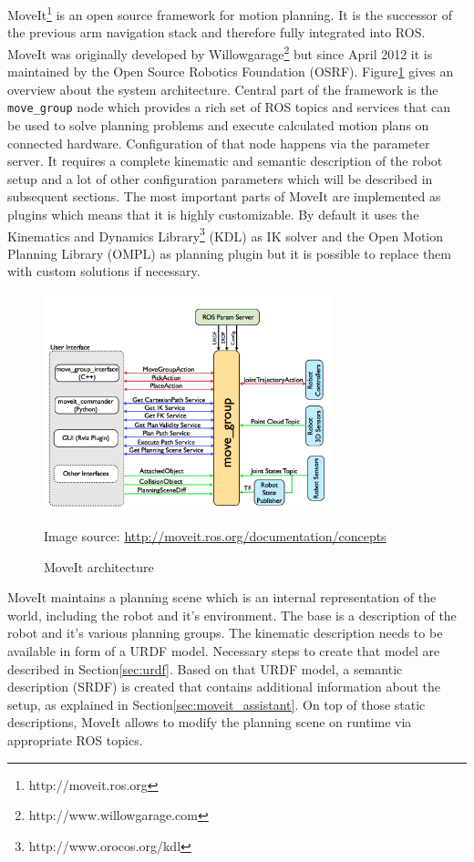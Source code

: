 MoveIt\footnote{http://moveit.ros.org} is an open source framework for motion planning. It is the successor of the previous arm navigation stack and therefore fully integrated into ROS. MoveIt was originally developed by Willowgarage\footnote{http://www.willowgarage.com} but since April 2012 it is maintained by the Open Source Robotics Foundation (OSRF). Figure\ref{fig:moveit_arch} gives an overview about the system architecture. Central part of the framework is the \texttt{move\_group} node which  provides a rich set of ROS topics and services that can be used to solve planning problems and execute calculated motion plans on connected hardware. Configuration of that node happens via the parameter server. It requires a complete kinematic and semantic description of the robot setup and a lot of other configuration parameters which will be described in subsequent sections. The most important parts of MoveIt are implemented as plugins which means that it is highly customizable. By default it uses the Kinematics and Dynamics Library\footnote{http://www.orocos.org/kdl} (KDL) as IK solver and the Open Motion Planning Library (OMPL) as planning plugin but it is possible to replace them with custom solutions if necessary.\\

\begin{figure}[ht]
	\centering
  	\includegraphics[width=0.75\textwidth]{images/moveit_architecture.jpg}
	\caption[Moveit architecture]{MoveIt architecture}
	{\scriptsize Image source: \url{http://moveit.ros.org/documentation/concepts}}
	\label{fig:moveit_arch}
\end{figure}

MoveIt maintains a planning scene which is an internal representation of the world, including the robot and it's environment. The base is a description of the robot and it's various planning groups. 
The kinematic description needs to be available in form of a URDF model. Necessary steps to create that model are described in Section\ref{sec:urdf}. Based on that URDF model, a semantic description (SRDF) is created that contains additional information about the setup, as explained in Section\ref{sec:moveit_assistant}. On top of those static descriptions, MoveIt allows to modify the planning scene on runtime via appropriate ROS topics.\\

